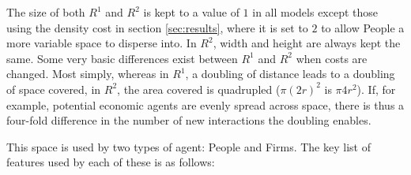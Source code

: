 The size of both $R^1$ and $R^2$ is kept to a value of $1$ in all models except those using the density cost in section \ref{sec:results}, where it is set to $2$ to allow People a more variable space to disperse into. In $R^2$, width and height are always kept the same. Some very basic differences exist between $R^1$ and $R^2$ when costs are changed. Most simply, whereas in $R^1$, a doubling of distance leads to a doubling of space covered, in $R^2$, the area covered is quadrupled ($\pi(2r)^2$ is $\pi 4r^2$). If, for example, potential economic agents are evenly spread across space, there is thus a four-fold difference in the number of new interactions the doubling enables.

This space is used by two types of agent: People and Firms. The key list of features used by each of these is as follows:

